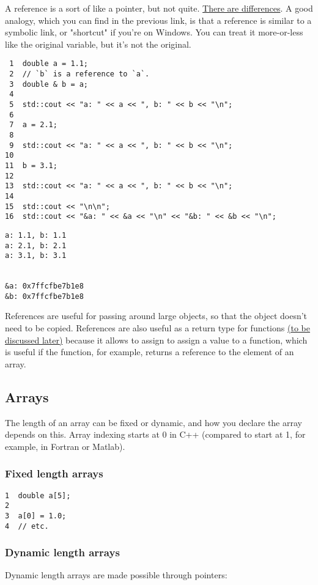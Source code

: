 \documentclass[11pt]{article}
\begin{document}
A reference is a sort of like a pointer, but not quite. \href{https://en.wikipedia.org/wiki/Reference_(C\%2B\%2B)}{There are differences}.
A good analogy, which you can find in the previous link, is that a reference
is similar to a symbolic link, or "shortcut" if you're on Windows. You can 
treat it more-or-less like the original variable, but it's not the original.

\begin{verbatim}
 1  double a = 1.1;
 2  // `b` is a reference to `a`.
 3  double & b = a;
 4  
 5  std::cout << "a: " << a << ", b: " << b << "\n";
 6  
 7  a = 2.1;
 8  
 9  std::cout << "a: " << a << ", b: " << b << "\n";
10  
11  b = 3.1;
12  
13  std::cout << "a: " << a << ", b: " << b << "\n";
14  
15  std::cout << "\n\n";
16  std::cout << "&a: " << &a << "\n" << "&b: " << &b << "\n";
\end{verbatim}

\begin{verbatim}
a: 1.1, b: 1.1
a: 2.1, b: 2.1
a: 3.1, b: 3.1


&a: 0x7ffcfbe7b1e8
&b: 0x7ffcfbe7b1e8
\end{verbatim}

References are useful for passing around large objects, so that the object
doesn't need to be copied. References are also useful as a return type for 
functions \hyperref[sec:orgheadline18]{(to be discussed later)} because it allows to assign to assign a 
value to a function, which is useful if the function, for example, returns 
a reference to the element of an array.

\subsection{Arrays}
\label{sec:orgheadline23}
The length of an array can be fixed or dynamic, and how you
declare the array depends on this. Array indexing starts at 0 in C++ 
(compared to start at 1, for example, in Fortran or Matlab).

\subsubsection{Fixed length arrays}
\label{sec:orgheadline21}
\begin{verbatim}
1  double a[5];
2  
3  a[0] = 1.0;
4  // etc.
\end{verbatim}

\subsubsection{Dynamic length arrays}
\label{sec:orgheadline22}
Dynamic length arrays are made possible through pointers:
\end{document}
